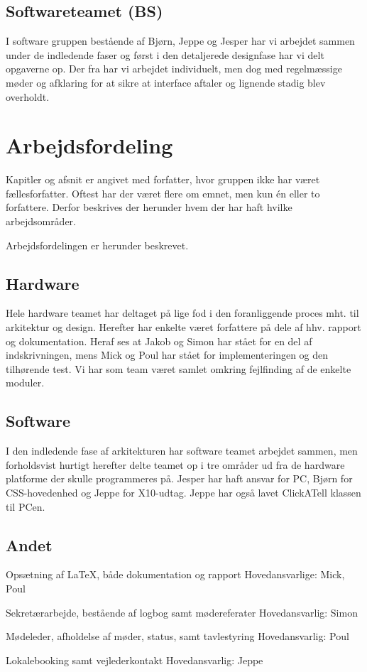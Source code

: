 \subsection{Softwareteamet (BS)}
I software gruppen bestående af Bjørn, Jeppe og Jesper har vi arbejdet sammen under de indledende faser og først i den detaljerede designfase har vi delt opgaverne op.
Der fra har vi arbejdet individuelt, men dog med regelmæssige møder og afklaring for at sikre at interface aftaler og lignende stadig blev overholdt.


\section{Arbejdsfordeling}
 
Kapitler og afsnit er angivet med forfatter, hvor gruppen ikke har været fællesforfatter. Oftest har der været flere om emnet, men kun én eller to forfattere. Derfor beskrives der herunder hvem der har haft hvilke arbejdsområder.  

Arbejdsfordelingen er herunder beskrevet. 

\subsection{Hardware} 
Hele hardware teamet har deltaget på lige fod i den foranliggende proces mht. til arkitektur og design. Herefter har enkelte været forfattere på dele af hhv. rapport og dokumentation. Heraf ses at Jakob og Simon har stået for en del af indskrivningen, mens Mick og Poul har stået for implementeringen og den tilhørende test.
Vi har som team været samlet omkring fejlfinding af de enkelte moduler.  

\subsection{Software}
I den indledende fase af arkitekturen har software teamet arbejdet sammen, men forholdsvist hurtigt herefter delte teamet op i tre områder ud fra de hardware platforme der skulle programmeres på. Jesper har haft ansvar for PC, Bjørn for CSS-hovedenhed og Jeppe for X10-udtag. Jeppe har også lavet ClickATell klassen til PCen.

\subsection{Andet}

Opsætning af \LaTeX, både dokumentation og rapport \newline
Hovedansvarlige: Mick, Poul 

Sekretærarbejde, bestående af logbog samt mødereferater \newline
Hovedansvarlig: Simon

Mødeleder, afholdelse af møder, status, samt tavlestyring \newline
Hovedansvarlig: Poul

Lokalebooking samt vejlederkontakt \newline
Hovedansvarlig: Jeppe